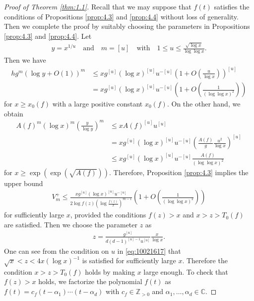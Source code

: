 \documentclass[a4paper,11pt]{amsart}
\theoremstyle{definition}
\numberwithin{equation}{section}
\begin{document}
\begin{proof}[Proof of Theorem \ref{thm:1.1}]
Recall that we may suppose that $f(t)$ satisfies the conditions of Propositions \ref{prop:4.3} and \ref{prop:4.4} without loss of generality. 
Then we complete the proof by suitably choosing the parameters in Propositions \ref{prop:4.3} and \ref{prop:4.4}. 
Let
\begin{align}\label{eq:10021617}
y
= x^{1/u}
\quad\text{and}\quad
m
= [u]
\quad\text{with}\quad
1 \leq u
\leq \frac{\sqrt{\log{x}}}{\log\log{x}}. 
\end{align}
Then we have
\begin{align*}
h g^m (\log{y}+O(1))^m
&\leq x g^{[u]} (\log{x})^{[u]} u^{-[u]} \left(1+O\left(\frac{u}{\log{x}}\right)\right)^{[u]} \\
&= x g^{[u]} (\log{x})^{[u]} u^{-[u]} \left(1+O\left(\frac{1}{(\log\log{x})^2}\right)\right) 
\end{align*}
for $x \geq x_0(f)$ with a large positive constant $x_0(f)$. 
On the other hand, we obtain
\begin{align}\label{eq:10021642}
A(f)^m (\log{x})^m \left(\frac{y}{\log{y}}\right)^m
&\leq x A(f)^{[u]} u^{[u]} \\
&= x g^{[u]} (\log{x})^{[u]} u^{-[u]} \left(\frac{A(f)}{g} \frac{u^2}{\log{x}}\right)^{[u]} \nonumber\\
&\leq x g^{[u]} (\log{x})^{[u]} u^{-[u]} \frac{A(f)}{(\log\log{x})^2} \nonumber
\end{align}
for $x \geq \exp(\exp(\sqrt{A(f)}))$.
Therefore, Proposition \ref{prop:4.3} implies the upper bound
\begin{align}\label{eq:10021637}
V_m^+
\leq \frac{x g^{[u]} (\log{x})^{[u]} u^{-[u]}}{2\log{f(z)} \left(\log{\frac{f(z)}{x}}\right)^{m-1}} 
\left(1+O\left(\frac{1}{(\log\log{x})^2}\right)\right)
\end{align}
for sufficiently large $x$, provided the conditions $f(z)>x$ and $x>z>T_0(f)$ are satisfied. 
Then we choose the parameter $z$ as 
\begin{align}\label{eq:10022046}
z 
= \frac{g^{[u]}}{d(d-1)^{[u]-1}u^{[u]}} \frac{x}{\log{x}}. 
\end{align}
One can see from the condition on $u$ in \eqref{eq:10021617} that $\sqrt{x}<z<4x (\log{x})^{-1}$ is satisfied for sufficiently large $x$. 
Therefore the condition $x>z>T_0(f)$ holds by making $x$ large enough. 
To check that $f(z)>x$ holds, we factorize the polynomial $f(t)$ as $f(t)=c_f(t-\alpha_1) \cdots (t-\alpha_d)$ with $c_f \in \mathbb{Z}_{>0}$ and $\alpha_1,\ldots,\alpha_d \in \mathbb{C}$. 

\end{proof}
\end{document}
